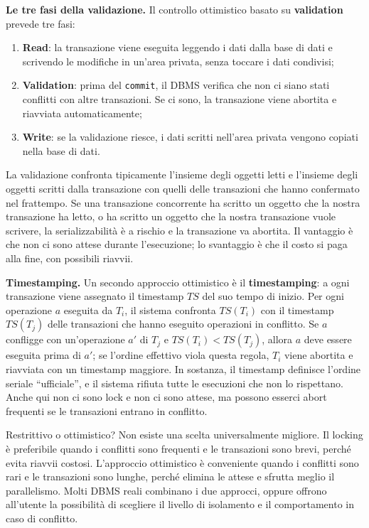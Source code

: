 \documentclass[12pt]{extarticle}
\begin{document}
\medskip
\noindent \textbf{Le tre fasi della validazione.} Il controllo ottimistico basato su \textbf{validation} prevede tre fasi:
\begin{enumerate}
    \item \textbf{Read}: la transazione viene eseguita leggendo i dati dalla base di dati e scrivendo le modifiche in un'area privata, senza toccare i dati condivisi;
    \item \textbf{Validation}: prima del \texttt{commit}, il DBMS verifica che non ci siano stati conflitti con altre transazioni. Se ci sono, la transazione viene abortita e riavviata automaticamente;
    \item \textbf{Write}: se la validazione riesce, i dati scritti nell'area privata vengono copiati nella base di dati.
\end{enumerate}
La validazione confronta tipicamente l'insieme degli oggetti letti e l'insieme degli oggetti scritti dalla transazione con quelli delle transazioni che hanno confermato nel frattempo. Se una transazione concorrente ha scritto un oggetto che la nostra transazione ha letto, o ha scritto un oggetto che la nostra transazione vuole scrivere, la serializzabilità è a rischio e la transazione va abortita. Il vantaggio è che non ci sono attese durante l'esecuzione; lo svantaggio è che il costo si paga alla fine, con possibili riavvii.

\medskip
\noindent \textbf{Timestamping.} Un secondo approccio ottimistico è il \textbf{timestamping}: a ogni transazione viene assegnato il timestamp $TS$ del suo tempo di inizio. Per ogni operazione $a$ eseguita da $T_i$, il sistema confronta $TS(T_i)$ con il timestamp $TS(T_j)$ delle transazioni che hanno eseguito operazioni in conflitto. Se $a$ confligge con un'operazione $a'$ di $T_j$ e $TS(T_i) < TS(T_j)$, allora $a$ deve essere eseguita prima di $a'$; se l'ordine effettivo viola questa regola, $T_i$ viene abortita e riavviata con un timestamp maggiore. In sostanza, il timestamp definisce l'ordine seriale ``ufficiale'', e il sistema rifiuta tutte le esecuzioni che non lo rispettano. Anche qui non ci sono lock e non ci sono attese, ma possono esserci abort frequenti se le transazioni entrano in conflitto.

\begin{cbox}{Restrittivo o ottimistico?}
\noindent Non esiste una scelta universalmente migliore. Il locking è preferibile quando i conflitti sono frequenti e le transazioni sono brevi, perché evita riavvii costosi. L'approccio ottimistico è conveniente quando i conflitti sono rari e le transazioni sono lunghe, perché elimina le attese e sfrutta meglio il parallelismo. Molti DBMS reali combinano i due approcci, oppure offrono all'utente la possibilità di scegliere il livello di isolamento e il comportamento in caso di conflitto.
\end{cbox}
\end{document}
